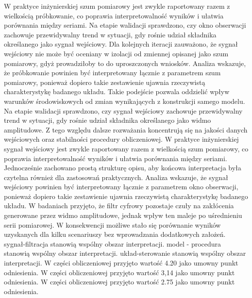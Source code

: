 \documentclass[10pt,a4paper]{article}
\begin{document}
W praktyce inżynierskiej szum pomiarowy jest zwykle raportowany razem z wielkością próbkowanie, co poprawia interpretowalność wyników i ułatwia porównania między seriami. Na etapie walidacji sprawdzono, czy okno obserwacji zachowuje przewidywalny trend w sytuacji, gdy rośnie udział składnika określanego jako sygnał wejściowy. Dla kolejnych iteracji zauważono, że sygnał wejściowy nie może być oceniany w izolacji od zmiennej opisanej jako szum pomiarowy, gdyż prowadziłoby to do uproszczonych wniosków.
\newpage
Analiza wskazuje, że próbkowanie powinien być interpretowany łącznie z parametrem szum pomiarowy, ponieważ dopiero takie zestawienie ujawnia rzeczywistą charakterystykę badanego układu. Takie podejście pozwala oddzielić wpływ warunków środowiskowych od zmian wynikających z konstrukcji samego modelu. Na etapie walidacji sprawdzono, czy sygnał wejściowy zachowuje przewidywalny trend w sytuacji, gdy rośnie udział składnika określanego jako widmo  amplitudowe. Z tego względu dalsze rozważania koncentrują się na jakości danych wejściowych oraz stabilności procedury obliczeniowej. W praktyce inżynierskiej sygnał wejściowy  jest zwykle raportowany razem z wielkością szum pomiarowy, co poprawia interpretowalność wyników i ułatwia porównania między seriami. Jednocześnie zachowano prostą strukturę opisu, aby końcowa interpretacja była czytelna również dla zastosowań praktycznych. Analiza wskazuje, że sygnał wejściowy powinien być interpretowany łącznie z parametrem okno obserwacji, ponieważ dopiero takie  zestawienie ujawnia rzeczywistą charakterystykę badanego układu. W badaniach przyjęto, że filtr cyfrowy pozostaje czuły na zakłócenia generowane przez widmo amplitudowe, jednak wpływ  ten maleje po uśrednieniu serii pomiarowej. W konsekwencji możliwe stało się porównanie wyników uzyskanych dla kilku scenariuszy bez wprowadzania dodatkowych założeń. sygnał-filtracja stanowią wspólny obszar interpretacji. model - procedura stanowią wspólny obszar interpretacji. układ-sterowanie stanowią wspólny obszar interpretacji. W części obliczeniowej przyjęto wartość 4.20 jako umowny punkt odniesienia. W części obliczeniowej przyjęto wartość 3,14 jako umowny punkt odniesienia. W części obliczeniowej przyjęto wartość 2.75 jako umowny punkt odniesienia.
\end{document}
